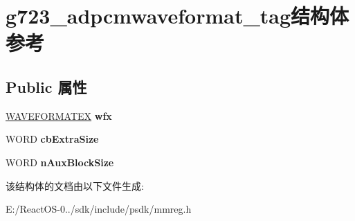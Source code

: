 \hypertarget{structg723__adpcmwaveformat__tag}{}\section{g723\+\_\+adpcmwaveformat\+\_\+tag结构体 参考}
\label{structg723__adpcmwaveformat__tag}
\subsection*{Public 属性}
\begin{DoxyCompactItemize}
\item 
\mbox{\label{structg723__adpcmwaveformat__tag_a8c50a4364912ed2cfc14d2afe8f37d3b}} 
\hyperlink{struct_w_a_v_e_f_o_r_m_a_t_e_x}{W\+A\+V\+E\+F\+O\+R\+M\+A\+T\+EX} {\bfseries wfx}
\item 
\mbox{\label{structg723__adpcmwaveformat__tag_ab2c1ef6609fc2d756e11c8cd9b6fc9c7}} 
W\+O\+RD {\bfseries cb\+Extra\+Size}
\item 
\mbox{\label{structg723__adpcmwaveformat__tag_a9184decf645013bed89e1afda636eb15}} 
W\+O\+RD {\bfseries n\+Aux\+Block\+Size}
\end{DoxyCompactItemize}


该结构体的文档由以下文件生成\+:\begin{DoxyCompactItemize}
\item 
E\+:/\+React\+O\+S-\/0../sdk/include/psdk/mmreg.\+h\end{DoxyCompactItemize}
